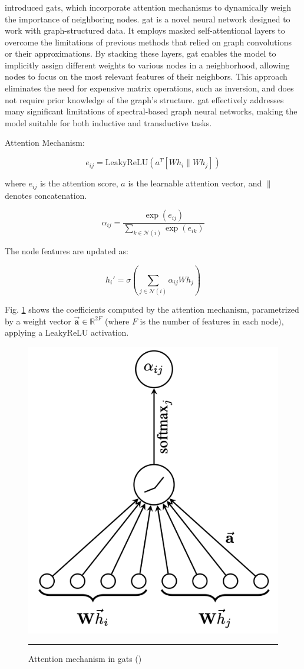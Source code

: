 \subsubsection*{}

\cite{Velickovic2018} introduced \glspl{gat}, which incorporate attention mechanisms to dynamically weigh the importance of neighboring nodes.
\gls{gat} is a novel neural network designed to work with graph-structured data.
It employs masked self-attentional layers to overcome the limitations of previous methods that relied on graph convolutions or their approximations.
By stacking these layers, \gls{gat} enables the model to implicitly assign different weights to various nodes in a neighborhood, allowing nodes to focus on the most relevant features of their neighbors.
This approach eliminates the need for expensive matrix operations, such as inversion, and does not require prior knowledge of the graph's structure.
\gls{gat} effectively addresses many significant limitations of spectral-based graph neural networks, making the model suitable for both inductive and transductive tasks.

Attention Mechanism:

\[ e_{ij} = \text{LeakyReLU}\left(a^T [W h_i \| W h_j]\right) \]

where \( e_{ij} \) is the attention score, \( a \) is the learnable attention vector, and \( \| \) denotes concatenation.

\[ \alpha_{ij} = \frac{\exp(e_{ij})}{\sum_{k \in \mathcal{N}(i)} \exp(e_{ik})} \]

The node features are updated as:

\[ h_i' = \sigma\left(\sum_{j \in \mathcal{N}(i)} \alpha_{ij} W h_j\right) \]

Fig. \ref{fig:gat-attention-mechanism} shows the coefficients computed by the attention mechanism, parametrized by a weight vector $\vec{\mathbf{a}} \in \mathbb{R}^{2F}$ (where $F$ is the number of features in each node), applying a LeakyReLU activation.
\begin{figure}[htbp]
    \centering
 \includegraphics[width=.3\textwidth]{03_Figures/literature-review/gat-attention-mechanism.png}
     \rule{35em}{0.5pt}
    \caption{Attention mechanism in \glspl{gat} (\cite{Velickovic2018})} 
 \label{fig:gat-attention-mechanism}
\end{figure}


